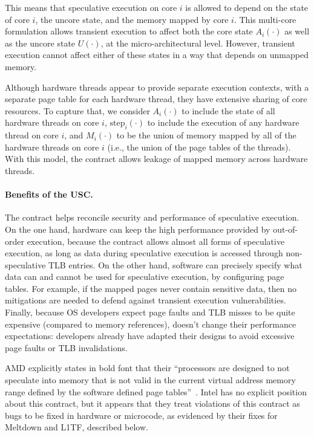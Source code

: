 This means that speculative execution on core $i$ is allowed to depend on
the state of core $i$, the uncore state, and the memory mapped by core
$i$.  This multi-core formulation allows transient execution to affect
both the core state $A_i(\cdot)$ as well as the uncore state $U(\cdot)$,
at the micro-architectural level.  However, transient execution cannot
affect either of these states in a way that depends on unmapped memory.

Although hardware threads appear to provide separate execution
contexts, with a separate page table for each hardware thread, they
have extensive sharing of core resources.  To capture that, we consider
$A_i(\cdot)$ to include the state of all hardware threads on core $i$,
$\textrm{step}_i(\cdot)$ to include the execution of any hardware thread
on core $i$, and $M_i(\cdot)$ to be the union of memory mapped by all
of the hardware threads on core $i$ (i.e., the union of the page tables
of the threads).  With this model, the contract allows leakage of mapped
memory across hardware threads.


\paragraph{Benefits of the USC.}

The contract helps reconcile security and performance of speculative
execution.  On the one hand, hardware can keep the high performance
provided by out-of-order execution, because the contract allows almost
all forms of speculative execution, as long as data during speculative
execution is accessed through non-speculative TLB entries.  On the
other hand, software can precisely specify what data can and cannot
be used for speculative execution, by configuring page
tables.  For example, if the mapped pages never contain sensitive data,
then no mitigations are needed to defend against transient execution
vulnerabilities.  Finally,
because OS developers expect page faults and TLB misses to be quite
expensive (compared to memory references), \contract doesn't change
their performance expectations: developers already have adapted their
designs to avoid excessive page faults or TLB invalidations.


AMD explicitly states in bold font that
their ``processors are designed to not speculate into memory that is
not valid in the current virtual address memory range defined by the
software defined page tables''~\cite[pg. 2]{amd:speculation}.  Intel
has no explicit position about this contract, but it appears
that they treat violations of this contract as bugs to be fixed in
hardware or microcode, as evidenced by their fixes for Meltdown and
L1TF, described below.

